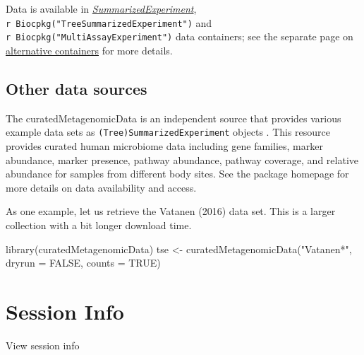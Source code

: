 \documentclass[
]{book}
\newenvironment{Shaded}{\begin{snugshade}}{\end{snugshade}}
\newcommand{\AttributeTok}[1]{\textcolor[rgb]{0.77,0.63,0.00}{#1}}
\newcommand{\ConstantTok}[1]{\textcolor[rgb]{0.00,0.00,0.00}{#1}}
\newcommand{\FunctionTok}[1]{\textcolor[rgb]{0.00,0.00,0.00}{#1}}
\newcommand{\NormalTok}[1]{#1}
\newcommand{\OtherTok}[1]{\textcolor[rgb]{0.56,0.35,0.01}{#1}}
\newcommand{\StringTok}[1]{\textcolor[rgb]{0.31,0.60,0.02}{#1}}
\begin{document}
Data is available in \emph{\href{https://bioconductor.org/packages/3.15/SummarizedExperiment}{SummarizedExperiment}}, \texttt{r\ Biocpkg("TreeSummarizedExperiment")} and \texttt{r\ Biocpkg("MultiAssayExperiment")} data containers; see the separate
page on \href{https://microbiome.github.io/OMA/multitable.html}{alternative
containers} for more
details.

\hypertarget{other-data-sources}{%
\subsection{Other data sources}\label{other-data-sources}}

The curatedMetagenomicData
is an independent source that provides various example data sets as
\texttt{(Tree)SummarizedExperiment} objects \citep{Pasolli2017}. This resource provides curated
human microbiome data including gene families, marker abundance,
marker presence, pathway abundance, pathway coverage, and relative
abundance for samples from different body sites. See the package
homepage for more details on data availability and access.

As one example, let us retrieve the Vatanen (2016) \citep{Vatanen2016} data
set. This is a larger collection with a bit longer download time.

\begin{Shaded}
\begin{Highlighting}[]
\FunctionTok{library}\NormalTok{(curatedMetagenomicData)}
\NormalTok{tse }\OtherTok{\textless{}{-}} \FunctionTok{curatedMetagenomicData}\NormalTok{(}\StringTok{"Vatanen*"}\NormalTok{, }\AttributeTok{dryrun =} \ConstantTok{FALSE}\NormalTok{, }\AttributeTok{counts =} \ConstantTok{TRUE}\NormalTok{)}
\end{Highlighting}
\end{Shaded}

\hypertarget{session-info}{%
\section*{Session Info}\label{session-info}}

View session info
\end{document}
